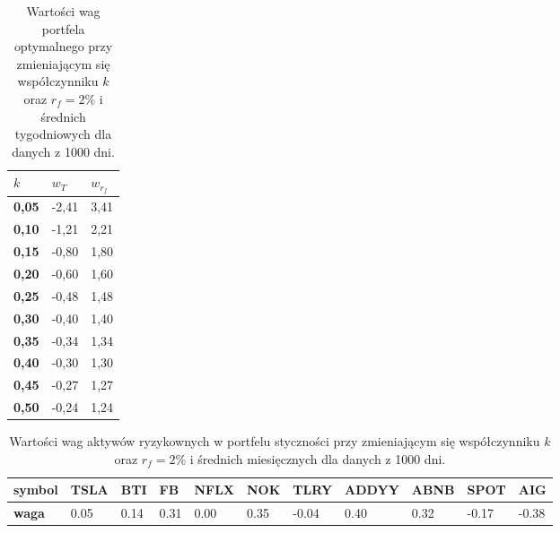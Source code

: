 \documentclass[magister]{dyplom}
\begin{document}
\begin{table}[ht!]
	\centering
	\caption{Wartości wag portfela optymalnego przy zmieniającym się współczynniku $k$ oraz $r_f = 2\%$ i średnich tygodniowych dla danych z 1000 dni.}
	\begin{tabular}{|l|l|l|}
		\hline
		\textbf{$k$} & \textbf{$w_T$} & \textbf{$w_{r_f}$} \\ \hline
		\textbf{0,05}                                             & -2,41         & 3,41            \\ \hline
		\textbf{0,10}                                             & -1,21         & 2,21            \\ \hline
		\textbf{0,15}                                             & -0,80         & 1,80            \\ \hline
		\textbf{0,20}                                             & -0,60         & 1,60            \\ \hline
		\textbf{0,25}                                             & -0,48         & 1,48            \\ \hline
		\textbf{0,30}                                             & -0,40         & 1,40            \\ \hline
		\textbf{0,35}                                             & -0,34         & 1,34            \\ \hline
		\textbf{0,40}                                             & -0,30         & 1,30            \\ \hline
		\textbf{0,45}                                             & -0,27         & 1,27            \\ \hline
		\textbf{0,50}                                             & -0,24         & 1,24            \\ \hline
	\end{tabular}
\end{table}
\begin{table}[ht!]
	\centering
	\caption{Wartości wag aktywów ryzykownych w portfelu styczności przy zmieniającym się współczynniku $k$ oraz $r_f = 2\%$ i średnich miesięcznych dla danych z 1000 dni.}
	\begin{tabular}{|l|l|l|l|l|l|l|l|l|l|l|}
		\hline
		\textbf{symbol} & \textbf{TSLA} & \textbf{BTI} & \textbf{FB} & \textbf{NFLX} & \textbf{NOK} & \textbf{TLRY} & \textbf{ADDYY} & \textbf{ABNB} & \textbf{SPOT} & \textbf{AIG} \\ \hline
		\textbf{waga}   & 0.05       & 0.14          & 0.31           & 0.00        & 0.35         & -0.04         & 0.40        & 0.32          & -0.17          & -0.38        \\ \hline
	\end{tabular}
\end{table}
\end{document}
